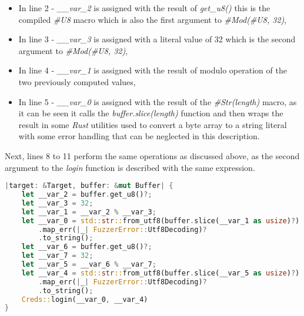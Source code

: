 \begin{itemize}
    \item In line 2 - \textit{\_\_var\_2} is assigned with the result of \textit{get\_u8()} this is the compiled \textit{\#U8} macro which is also the first argument to \textit{\#Mod(\#U8, 32)},
    \item In line 3 - \textit{\_\_var\_3} is assigned with a literal value of 32 which is the second argument to \textit{\#Mod(\#U8, 32)},
    \item In line 4 - \textit{\_\_var\_1} is assigned with the result of modulo operation of the two previously computed values,
    \item In line 5 - \textit{\_\_var\_0} is assigned with the result of the \textit{\#Str(length)} macro, as it can be seen it calls the \textit{buffer.slice(length)} function and then wraps the result in some \textit{Rust} utilities used to convert a byte array to a string literal with some error handling that can be neglected in this description.
\end{itemize}
Next, lines 8 to 11 perform the same operations as discussed above, as the second argument to the \textit{login} function is described with the same expression.

\begin{minipage}{\linewidth}
\begin{lstlisting}[language=rust,caption={Example of compiler output.},label={lst:compiler_out}]
|target: &Target, buffer: &mut Buffer| {
    let __var_2 = buffer.get_u8()?;
    let __var_3 = 32;
    let __var_1 = __var_2 % __var_3;
    let __var_0 = std::str::from_utf8(buffer.slice(__var_1 as usize)?)
        .map_err(|_| FuzzerError::Utf8Decoding)?
        .to_string();
    let __var_6 = buffer.get_u8()?;
    let __var_7 = 32;
    let __var_5 = __var_6 % __var_7;
    let __var_4 = std::str::from_utf8(buffer.slice(__var_5 as usize)?)
        .map_err(|_| FuzzerError::Utf8Decoding)?
        .to_string();
    Creds::login(__var_0, __var_4)
}
\end{lstlisting} 
\end{minipage}


